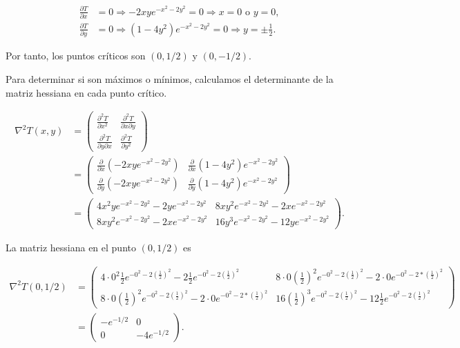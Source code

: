 \documentclass[
  spanish,
  a4paper,
]{scrreport}
\theoremstyle{definition}
\theoremstyle{remark}
\begin{document}
\begin{tcolorbox}
\begin{enumerate}
  \begin{align*}
  \frac{\partial T}{\partial x} &= 0 \Rightarrow -2xye^{-x^2-2y^2} = 0 \Rightarrow x = 0 \mbox{ o } y = 0, \\
  \frac{\partial T}{\partial y} &= 0 \Rightarrow (1-4y^2)e^{-x^2-2y^2} = 0 \Rightarrow y = \pm \frac{1}{2}.
  \end{align*}

  Por tanto, los puntos críticos son \((0,1/2)\) y \((0,-1/2)\).

  Para determinar si son máximos o mínimos, calculamos el determinante
  de la matriz hessiana en cada punto crítico.

  \begin{align*}
  \nabla^2T(x,y) &= \begin{pmatrix}
  \frac{\partial^2 T}{\partial x^2} & \frac{\partial^2 T}{\partial x\partial y} \\
  \frac{\partial^2 T}{\partial y\partial x} & \frac{\partial^2 T}{\partial y^2}
  \end{pmatrix} \\
  &= \begin{pmatrix}
  \frac{\partial}{\partial x}(-2xye^{-x^2-2y^2}) & \frac{\partial}{\partial x}(1-4y^2)e^{-x^2-2y^2} \\
  \frac{\partial}{\partial y}(-2xye^{-x^2-2y^2}) & \frac{\partial}{\partial y}(1-4y^2)e^{-x^2-2y^2}
  \end{pmatrix} \\
  &= \begin{pmatrix}
  4x^2ye^{-x^2 - 2y^2} - 2ye^{-x^2 - 2y^2} & 8xy^2e^{-x^2 - 2y^2} - 2xe^{-x^2 - 2y^2} \\
  8xy^2e^{-x^2 - 2y^2} - 2xe^{-x^2 - 2y^2} & 16y^3e^{-x^2 - 2y^2} - 12ye^{-x^2 - 2y^2}
  \end{pmatrix}.
  \end{align*}

  La matriz hessiana en el punto \((0,1/2)\) es

  \begin{align*}
  \nabla^2T(0,1/2) 
  &= \begin{pmatrix}
  4\cdot 0^2\frac{1}{2}e^{-0^2 - 2\left(\frac{1}{2}\right)^2} - 2\frac{1}{2}e^{-0^2 - 2\left(\frac{1}{2}\right)^2} & 8\cdot 0\left(\frac{1}{2}\right)^2e^{-0^2 - 2\left(\frac{1}{2}\right)^2} - 2\cdot 0e^{-0^2 - 2*\left(\frac{1}{2}\right)^2} \\
  8\cdot 0\left(\frac{1}{2}\right)^2e^{-0^2 - 2\left(\frac{1}{2}\right)^2} - 2\cdot 0e^{-0^2 - 2*\left(\frac{1}{2}\right)^2} & 16\left(\frac{1}{2}\right)^3e^{-0^2 - 2\left(\frac{1}{2}\right)^2} - 12\frac{1}{2}e^{-0^2 - 2\left(\frac{1}{2}\right)^2} 
  \end{pmatrix}\\
  &= \begin{pmatrix}
  -e^{-1/2} & 0 \\
  0 & -4e^{-1/2}
  \end{pmatrix}.
  \end{align*}


\end{enumerate}
\end{tcolorbox}
\end{document}
